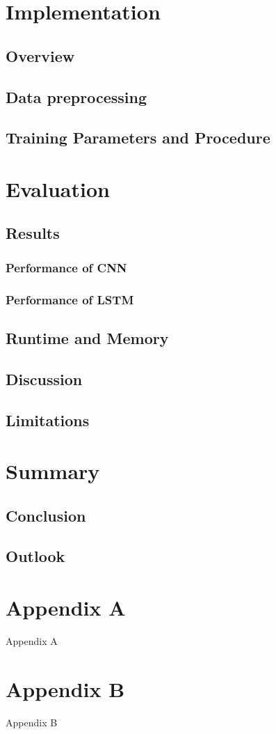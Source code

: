\documentclass{article}
\begin{document}
\section{Implementation}
\subsection{Overview}
\subsection{Data preprocessing}
\subsection{Training Parameters and Procedure}

\section{Evaluation}
\subsection{Results}
\subsubsection{Performance of CNN}
\subsubsection{Performance of LSTM}

\subsection{Runtime and Memory}
\subsection{Discussion}
\subsection{Limitations}


\section{Summary}
\subsection{Conclusion}
\subsection{Outlook}





\begin{appendices}
\section{Appendix A}
Appendix A
\section{Appendix B}
Appendix B
\end{appendices}
\end{document}
